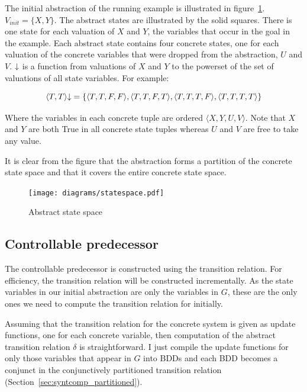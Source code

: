 The initial abstraction of the running example is illustrated in figure~\ref{fig:abs_state_sp}. $V_{init} = \{X, Y\}$. The abstract states are illustrated by the solid squares. There is one state for each valuation of $X$ and $Y$, the variables that occur in the goal in the example. Each abstract state contains four concrete states, one for each valuation of the concrete variables that were dropped from the abstraction, $U$ and $V$. $\mathord{\downarrow}$ is a function from valuations of $X$ and $Y$ to the powerset of the set of valuations of all state variables. For example:

\begin{equation}
    \langle T, T \rangle\mathord{\downarrow} = \{ \langle T, T, F, F \rangle, \langle T, T, F, T \rangle, \langle T, T, T, F \rangle, \langle T, T, T, T \rangle \}
\end{equation}

Where the variables in each concrete tuple are ordered $\langle X, Y, U, V \rangle$. Note that $X$ and $Y$ are both True in all concrete state tuples whereas $U$ and $V$ are free to take any value.

It is clear from the figure that the abstraction forms a partition of the concrete state space and that it covers the entire concrete state space.

\begin{figure}[t]
\centering
\texttt{[image: diagrams/statespace.pdf]}
\caption{Abstract state space}
\label{fig:abs_state_sp}
\end{figure}

\subsection{Controllable predecessor}
\label{sec:var_cpre}

The controllable predecessor is constructed using the transition relation. For efficiency, the transition relation will be constructed incrementally. As the state variables in our initial abstraction are only the variables in $G$, these are the only ones we need to compute the transition relation for initially.

Assuming that the transition relation for the concrete system is given as update functions, one for each concrete variable, then computation of the abstract transition relation $\delta$ is straightforward. I just compile the update functions for only those variables that appear in $G$ into BDDs and each BDD becomes a conjunct in the conjunctively partitioned transition relation (Section~\ref{sec:syntcomp_partitioned}).

